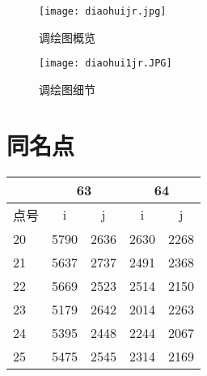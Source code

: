 \begin{figure}[htbp]
\centering
\caption{调绘图概览}
\texttt{[image: diaohuijr.jpg]}
\end{figure}

\begin{figure}[htbp]
\centering
\caption{调绘图细节}
\texttt{[image: diaohui1jr.JPG]}
\end{figure}

\section{同名点}


\begin{table}[htbp]
    \centering
    \begin{tabular}{lrrrr}
        \toprule
        & \multicolumn{2}{c}{63} & \multicolumn{2}{c}{64} \\ \hline
        点号 & \multicolumn{1}{c}{i} & \multicolumn{1}{c}{j} & \multicolumn{1}{c}{i} & \multicolumn{1}{c|}{j} \\ \midrule
      20 & 5790 & 2636 & 2630 & 2268 \\
      21 & 5637 & 2737 & 2491 & 2368 \\
      22 & 5669 & 2523 & 2514 & 2150 \\
      23 & 5179 & 2642 & 2014 & 2263 \\
      24 & 5395 & 2448 & 2244 & 2067 \\
      25 & 5475 & 2545 & 2314 & 2169 \\ \bottomrule
    \end{tabular}
    \end{table}
      
